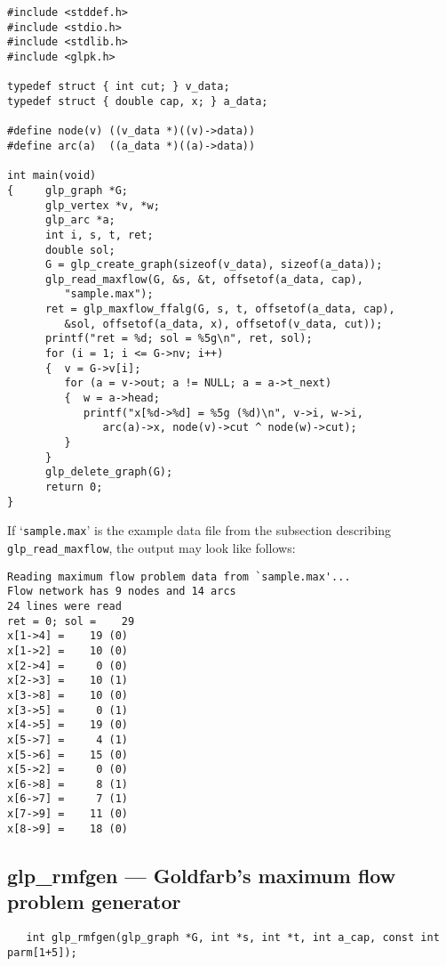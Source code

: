 \documentclass[11pt]{report}
\def\para#1{\noindent{\bf#1}}
\def\synopsis{\para{Synopsis}}
\begin{document}
\begin{footnotesize}
\begin{verbatim}
#include <stddef.h>
#include <stdio.h>
#include <stdlib.h>
#include <glpk.h>

typedef struct { int cut; } v_data;
typedef struct { double cap, x; } a_data;

#define node(v) ((v_data *)((v)->data))
#define arc(a)  ((a_data *)((a)->data))

int main(void)
{     glp_graph *G;
      glp_vertex *v, *w;
      glp_arc *a;
      int i, s, t, ret;
      double sol;
      G = glp_create_graph(sizeof(v_data), sizeof(a_data));
      glp_read_maxflow(G, &s, &t, offsetof(a_data, cap),
         "sample.max");
      ret = glp_maxflow_ffalg(G, s, t, offsetof(a_data, cap),
         &sol, offsetof(a_data, x), offsetof(v_data, cut));
      printf("ret = %d; sol = %5g\n", ret, sol);
      for (i = 1; i <= G->nv; i++)
      {  v = G->v[i];
         for (a = v->out; a != NULL; a = a->t_next)
         {  w = a->head;
            printf("x[%d->%d] = %5g (%d)\n", v->i, w->i,
               arc(a)->x, node(v)->cut ^ node(w)->cut);
         }
      }
      glp_delete_graph(G);
      return 0;
}
\end{verbatim}
\end{footnotesize}

If `\verb|sample.max|' is the example data file from the subsection
describing \verb|glp_read_maxflow|, the output may look like follows:

\begin{footnotesize}
\begin{verbatim}
Reading maximum flow problem data from `sample.max'...
Flow network has 9 nodes and 14 arcs
24 lines were read
ret = 0; sol =    29
x[1->4] =    19 (0)
x[1->2] =    10 (0)
x[2->4] =     0 (0)
x[2->3] =    10 (1)
x[3->8] =    10 (0)
x[3->5] =     0 (1)
x[4->5] =    19 (0)
x[5->7] =     4 (1)
x[5->6] =    15 (0)
x[5->2] =     0 (0)
x[6->8] =     8 (1)
x[6->7] =     7 (1)
x[7->9] =    11 (0)
x[8->9] =    18 (0)
\end{verbatim}
\end{footnotesize}

\subsection{glp\_rmfgen --- Goldfarb's maximum flow problem generator}

\synopsis

\begin{verbatim}
   int glp_rmfgen(glp_graph *G, int *s, int *t, int a_cap, const int parm[1+5]);
\end{verbatim}
\end{document}
